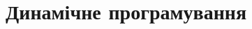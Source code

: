\documentclass[12pt,a4paper]{report}
\begin{document}
\chapter{Динамічне програмування}
\end{document}
